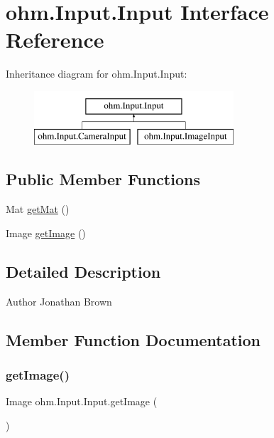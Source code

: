 \hypertarget{interfaceohm_1_1_input_1_1_input}{}\section{ohm.\+Input.\+Input Interface Reference}
\label{interfaceohm_1_1_input_1_1_input}
Inheritance diagram for ohm.\+Input.\+Input\+:\begin{figure}[H]
\begin{center}
\leavevmode
\includegraphics[height=2.000000cm]{interfaceohm_1_1_input_1_1_input}
\end{center}
\end{figure}
\subsection*{Public Member Functions}
\begin{DoxyCompactItemize}
\item 
Mat \hyperlink{interfaceohm_1_1_input_1_1_input_a9e65aa172b8ea1add3c2f09df554f198}{get\+Mat} ()
\item 
Image \hyperlink{interfaceohm_1_1_input_1_1_input_aa58ab6e0dd8e835ac9b819402d150d17}{get\+Image} ()
\end{DoxyCompactItemize}


\subsection{Detailed Description}
\begin{DoxyAuthor}{Author}
Jonathan Brown 
\end{DoxyAuthor}


\subsection{Member Function Documentation}
\hypertarget{interfaceohm_1_1_input_1_1_input_aa58ab6e0dd8e835ac9b819402d150d17}{}\label{interfaceohm_1_1_input_1_1_input_aa58ab6e0dd8e835ac9b819402d150d17} 
\subsubsection{\texorpdfstring{get\+Image()}{getImage()}}
{\footnotesize\ttfamily Image ohm.\+Input.\+Input.\+get\+Image (\begin{DoxyParamCaption}{ }\end{DoxyParamCaption})}

